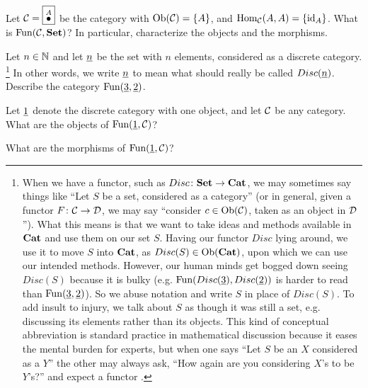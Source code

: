 \begin{exercise}
Let $\mathcal{C}=\fbox{$\stackrel{A}{\bullet}$}$ be the category with $\textnormal{Ob}(\mathcal{C})=\{A\}$, and $\textnormal{Hom}_\mathcal{C}(A,A)=\{\textnormal{id}_A\}$. What is $\textnormal{Fun}(\mathcal{C},{\bf Set})$? In particular, characterize the objects and the morphisms.
\end{exercise}

\begin{exercise}
Let $n\in{\mathbb N}$ and let $\underline{n}$ be the set with $n$ elements, considered as a discrete category.
\footnote{When we have a functor, such as $Disc\colon{\bf Set}\rightarrow{\bf Cat}$, we may sometimes say things like “Let $S$ be a set, considered as a category” (or in general, given a functor $F\colon\mathcal{C}\rightarrow\mathcal{D}$, we may say “consider $c\in\textnormal{Ob}(\mathcal{C})$, taken as an object in $\mathcal{D}$”). What this means is that we want to take ideas and methods available in ${\bf Cat}$ and use them on our set $S$. Having our functor $Disc$ lying around, we use it to move $S$ into ${\bf Cat}$, as $Disc(S)\in\textnormal{Ob}({\bf Cat})$, upon which we can use our intended methods. However, our human minds get bogged down seeing $Disc(S)$ because it is bulky (e.g. $\textnormal{Fun}(Disc(\underline{3}),Disc(\underline{2}))$ is harder to read than $\textnormal{Fun}(\underline{3},\underline{2})$). So we abuse notation and write $S$ in place of  $Disc(S)$. To add insult to injury, we talk about $S$ as though it was still a set, e.g. discussing its elements rather than its objects. This kind of conceptual abbreviation is standard practice in mathematical discussion because it eases the mental burden for experts, but when one says “Let $S$ be an $X$ considered as a $Y$” the other may always ask, “How again are you considering $X$'s to be $Y$'s?” and expect a functor .}
In other words, we write $\underline{n}$ to mean what should really be called $Disc(\underline{n})$. Describe the category $\textnormal{Fun}(\underline{3},\underline{2})$.
\end{exercise}

\begin{exercise}
Let $\underline{1}$ denote the discrete category with one object, and let $\mathcal{C}$ be any category.
\sexc What are the objects of $\textnormal{Fun}(\underline{1},\mathcal{C})$?
\item What are the morphisms of $\textnormal{Fun}(\underline{1},\mathcal{C})$?
\endsexc
\end{exercise}

